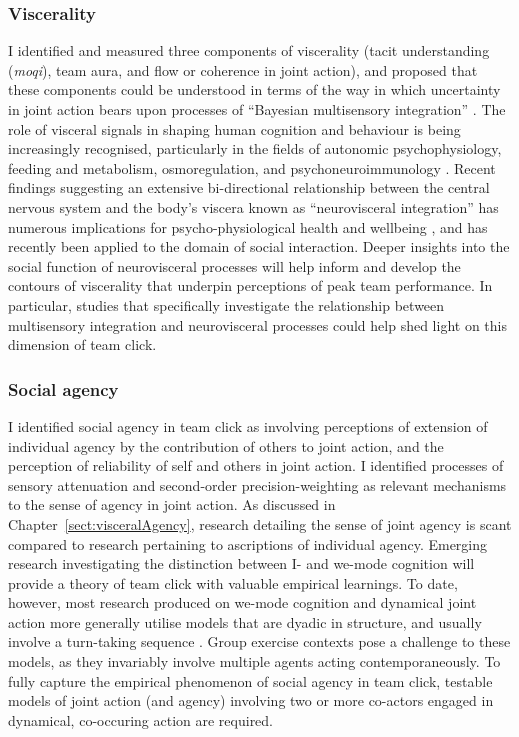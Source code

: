\subsubsection{Viscerality}
I identified and measured three components of viscerality (tacit understanding (\textit{moqi}), team aura, and flow or coherence in joint action), and proposed that these components could be understood in terms of the way in which uncertainty in joint action bears upon processes of ``Bayesian multisensory integration'' \citep{Ernst2004}.
The role of visceral signals in shaping human cognition and behaviour is being increasingly recognised, particularly in the fields of autonomic psychophysiology, feeding and metabolism, osmoregulation, and psychoneuroimmunology \citep[see:][]{Crtichely2013}.  Recent findings suggesting an extensive bi-directional relationship between the central nervous system and the body's viscera known as ``neurovisceral integration'' \citep[the gut-brain axis; see][]{Carabotti2015} has numerous implications for psycho-physiological health and wellbeing \citep{Porges2009}, and has recently been applied to the domain of social interaction\citep[see:][]{Porges2001,VanKleef2008,Akinola2014}.  Deeper insights into the social function of neurovisceral processes will help inform and develop the contours of viscerality that underpin perceptions of peak team performance.  In particular, studies that specifically investigate the relationship between multisensory integration and neurovisceral processes could help shed light on this dimension of team click.

\subsubsection{Social agency}
I identified social agency in team click as involving perceptions of extension of individual agency by the contribution of others to joint action, and the perception of reliability of self and others in joint action.  I identified  processes of sensory attenuation and second-order precision-weighting as relevant mechanisms to the sense of agency in joint action.  As discussed in Chapter~\ref{sect:visceralAgency}, research detailing the sense of joint agency is scant compared to research pertaining to ascriptions of individual agency.  Emerging research investigating the distinction between I- and we-mode cognition \citep{Gallotti2013,VanderWel2015,Noy2017} will provide a theory of team click with valuable empirical learnings.  To date, however, most research produced on we-mode cognition and dynamical joint action more generally utilise models that are dyadic in structure, and usually involve a turn-taking sequence \citep{Friston2015,Pesquita2017}.  Group exercise contexts pose a challenge to these models, as they invariably involve multiple agents acting contemporaneously. To fully capture the empirical phenomenon of social agency in team click, testable models of joint action (and agency) involving two or more co-actors engaged in dynamical, co-occuring action are required.

